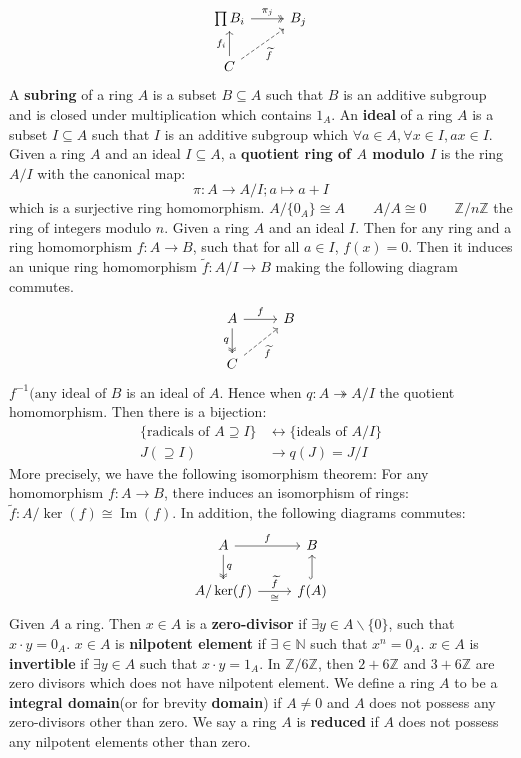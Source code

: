 \documentclass[12pt]{article}
\theoremstyle{definition}
\theoremstyle{plain}
\DeclareMathOperator{\im}{Im}
\newcommand{\nat}{\mathbb{N}}
\newcommand{\z}{\mathbb{Z}}
\renewcommand{\tilde}{\widetilde}
\begin{document}
\begin{equation}\begin{tikzcd}
\prod B_i\ar[two heads]{r}{\pi_j} &B_j\\
C\arrow{u}{f_i} \ar[dashed]{ru}[swap]{\tilde{f}}
\end{tikzcd}
\end{equation}
\Def A \textbf{subring} of a ring $A$ is a subset $B\subseteq A$ such that $B$ is an additive subgroup and is closed under multiplication which contains $1_A$. An \textbf{ideal} of a ring $A$ is a subset $I\subseteq A$ such that $I$ is an additive subgroup which $\forall a\in A, \forall x\in I, ax\in I$.
\Def Given a ring $A$ and an ideal $I\subseteq A$, a \textbf{quotient ring of $A$ modulo $I$} is the ring $A/I$ with the canonical map:
$$\pi: A\to A/I; a\mapsto a+I$$
which is a surjective ring homomorphism.
\Exe $A/\{0_A\}\cong A \qquad A/A\cong 0 \qquad \z/n\z$ the ring of integers modulo $n$.
 Given a ring $A$ and an ideal $I$. Then for any ring and a ring homomorphism $f:A\to B$, such that for all $a\in I$, $f(x)=0$. Then it induces an unique ring homomorphism $\tilde{f}:A/I\to B$ making the following diagram commutes.
\begin{equation}\begin{tikzcd}
A\ar{r}{f} \ar[two heads]{d}[swap]{q}&B\\
C\arrow[dashed]{ru}[swap]{\tilde{f}}
\end{tikzcd}
\end{equation}
\Rmk $f^{-1}(\text{any ideal of }B$ is an ideal of $A$. Hence when $q:A\twoheadrightarrow A/I$ the quotient homomorphism. Then there is a bijection:
\begin{align*}
  \{\text{radicals of }A\supseteq I\} &\longleftrightarrow \{\text{ideals of }A/I\}\\
  J(\supseteq I)&\to q(J)=J/I
\end{align*}
More precisely, we have the following isomorphism theorem:
\Theo For any homomorphism $f:A\to B$, there induces an isomorphism of rings: $\tilde{f}:A/\ker(f)\cong \im(f)$. In addition, the following diagrams commutes:
\begin{equation}
  \begin{tikzcd}
    A\ar{r}{f} \ar[two heads]{d}{q} & B\\
    A/\ker(f) \ar{r}{\tilde{f}}[swap]{\cong} & f(A)\ar[hook]{u}
  \end{tikzcd}
\end{equation}
\Def Given $A$ a ring. Then $x\in A$ is a \textbf{zero-divisor} if $\exists y\in A\backslash\{0\}$, such that $x\cdot y=0_A$. $x\in A$ is \textbf{nilpotent element} if $\exists \in \nat$ such that $x^n=0_A$. $x\in A$ is \textbf{invertible} if $\exists y\in A$ such that $x\cdot y=1_A$.
\Exe In $\z/6\z$, then $2+6\z$ and $3+6\z$ are zero divisors which does not have nilpotent element.
\Def We define a ring $A$ to be a \textbf{integral domain}(or for brevity \textbf{domain}) if $A\neq 0$ and $A$ does not possess any zero-divisors other than zero. We say a ring $A$ is \textbf{reduced} if $A$ does not possess any nilpotent elements other than zero.
\end{document}
